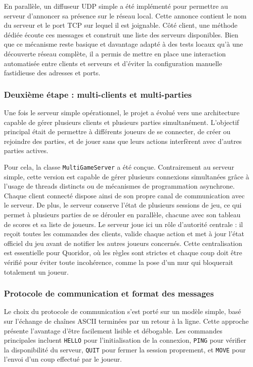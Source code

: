 \documentclass[a4paper]{article}
\begin{document}
En parallèle, un diffuseur UDP simple a été implémenté pour permettre au serveur d’annoncer sa présence sur le réseau local. Cette annonce contient le nom du serveur et le port TCP sur lequel il est joignable. Côté client, une méthode dédiée écoute ces messages et construit une liste des serveurs disponibles. Bien que ce mécanisme reste basique et davantage adapté à des tests locaux qu’à une découverte réseau complète, il a permis de mettre en place une interaction automatisée entre clients et serveurs et d’éviter la configuration manuelle fastidieuse des adresses et ports.


\subsubsection{Deuxième étape : multi-clients et multi-parties}


Une fois le serveur simple opérationnel, le projet a évolué vers une architecture capable de gérer plusieurs clients et plusieurs parties simultanément. L’objectif principal était de permettre à différents joueurs de se connecter, de créer ou rejoindre des parties, et de jouer sans que leurs actions interfèrent avec d’autres parties actives.


Pour cela, la classe \texttt{MultiGameServer} a été conçue. Contrairement au serveur simple, cette version est capable de gérer plusieurs connexions simultanées grâce à l’usage de threads distincts ou de mécanismes de programmation asynchrone. Chaque client connecté dispose ainsi de son propre canal de communication avec le serveur. De plus, le serveur conserve l’état de plusieurs sessions de jeu, ce qui permet à plusieurs parties de se dérouler en parallèle, chacune avec son tableau de scores et sa liste de joueurs. Le serveur joue ici un rôle d’autorité centrale : il reçoit toutes les commandes des clients, valide chaque action et met à jour l’état officiel du jeu avant de notifier les autres joueurs concernés. Cette centralisation est essentielle pour Quoridor, où les règles sont strictes et chaque coup doit être vérifié pour éviter toute incohérence, comme la pose d’un mur qui bloquerait totalement un joueur.


\subsubsection{Protocole de communication et format des messages}

Le choix du protocole de communication s’est porté sur un modèle simple, basé sur l’échange de chaînes ASCII terminées par un retour à la ligne. Cette approche présente l'avantage d'être facilement lisible et débogable. Les commandes principales incluent \texttt{HELLO} pour l’initialisation de la connexion, \texttt{PING} pour vérifier la disponibilité du serveur, \texttt{QUIT} pour fermer la session proprement, et \texttt{MOVE} pour l’envoi d’un coup effectué par le joueur.
\end{document}
